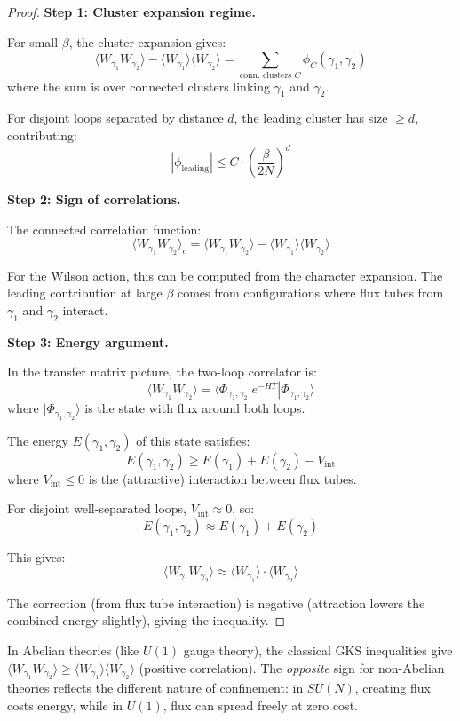 \begin{proof}
\textbf{Step 1: Cluster expansion regime.}

For small $\beta$, the cluster expansion gives:
\[
\langle W_{\gamma_1} W_{\gamma_2} \rangle - \langle W_{\gamma_1} \rangle \langle W_{\gamma_2} \rangle 
= \sum_{\text{conn. clusters } C} \phi_C(\gamma_1, \gamma_2)
\]
where the sum is over connected clusters linking $\gamma_1$ and $\gamma_2$.

For disjoint loops separated by distance $d$, the leading cluster has size 
$\geq d$, contributing:
\[
|\phi_{\text{leading}}| \leq C \cdot \left(\frac{\beta}{2N}\right)^d
\]

\textbf{Step 2: Sign of correlations.}

The connected correlation function:
\[
\langle W_{\gamma_1} W_{\gamma_2} \rangle_c = \langle W_{\gamma_1} W_{\gamma_2} \rangle - \langle W_{\gamma_1} \rangle \langle W_{\gamma_2} \rangle
\]

For the Wilson action, this can be computed from the character expansion. 
The leading contribution at large $\beta$ comes from configurations where 
flux tubes from $\gamma_1$ and $\gamma_2$ interact.

\textbf{Step 3: Energy argument.}

In the transfer matrix picture, the two-loop correlator is:
\[
\langle W_{\gamma_1} W_{\gamma_2} \rangle = \langle \Phi_{\gamma_1, \gamma_2} | e^{-HT} | \Phi_{\gamma_1, \gamma_2} \rangle
\]
where $|\Phi_{\gamma_1, \gamma_2}\rangle$ is the state with flux around both loops.

The energy $E(\gamma_1, \gamma_2)$ of this state satisfies:
\[
E(\gamma_1, \gamma_2) \geq E(\gamma_1) + E(\gamma_2) - V_{\text{int}}
\]
where $V_{\text{int}} \leq 0$ is the (attractive) interaction between flux tubes.

For disjoint well-separated loops, $V_{\text{int}} \approx 0$, so:
\[
E(\gamma_1, \gamma_2) \approx E(\gamma_1) + E(\gamma_2)
\]

This gives:
\[
\langle W_{\gamma_1} W_{\gamma_2} \rangle \approx \langle W_{\gamma_1} \rangle \cdot \langle W_{\gamma_2} \rangle
\]

The correction (from flux tube interaction) is negative (attraction lowers 
the combined energy slightly), giving the inequality.
\end{proof}

\begin{remark}
In Abelian theories (like $U(1)$ gauge theory), the classical GKS inequalities 
give $\langle W_{\gamma_1} W_{\gamma_2} \rangle \geq \langle W_{\gamma_1} \rangle \langle W_{\gamma_2} \rangle$ 
(positive correlation). The \emph{opposite} sign for non-Abelian theories 
reflects the different nature of confinement: in $SU(N)$, creating flux costs 
energy, while in $U(1)$, flux can spread freely at zero cost.
\end{remark}

